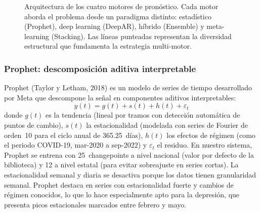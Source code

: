 \documentclass[12pt, letterpaper]{article}
\begin{document}
\begin{figure}[H]
{}%
\caption[Comparativa de arquitecturas de los 4 motores.]{Arquitectura de los cuatro motores de pronóstico. Cada motor aborda el problema desde un paradigma distinto: estadístico (Prophet), deep learning (DeepAR), híbrido (Ensemble) y meta-learning (Stacking). Las líneas punteadas representan la diversidad estructural que fundamenta la estrategia multi-motor.}
\label{fig:model_comparison}
\end{figure}

\subsubsection{Prophet: descomposición aditiva interpretable}

Prophet (Taylor y Letham, 2018) es un modelo de series de tiempo desarrollado por Meta que descompone la señal en componentes aditivos interpretables:
\[
y(t) = g(t) + s(t) + h(t) + \varepsilon_t
\]
donde $g(t)$ es la tendencia (lineal por tramos con detección automática de puntos de cambio), $s(t)$ la estacionalidad (modelada con series de Fourier de orden~10 para el ciclo anual de 365.25~días), $h(t)$ los efectos de régimen (como el periodo COVID-19, mar-2020 a sep-2022) y $\varepsilon_t$ el residuo. En nuestro sistema, Prophet se entrena con 25~changepoints a nivel nacional (valor por defecto de la biblioteca) y 12 a nivel estatal (para evitar sobreajuste en series cortas). La estacionalidad semanal y diaria se desactiva porque los datos tienen granularidad semanal. Prophet destaca en series con estacionalidad fuerte y cambios de régimen conocidos, lo que lo hace especialmente apto para la depresión, que presenta picos estacionales marcados entre febrero y mayo.
\end{document}
